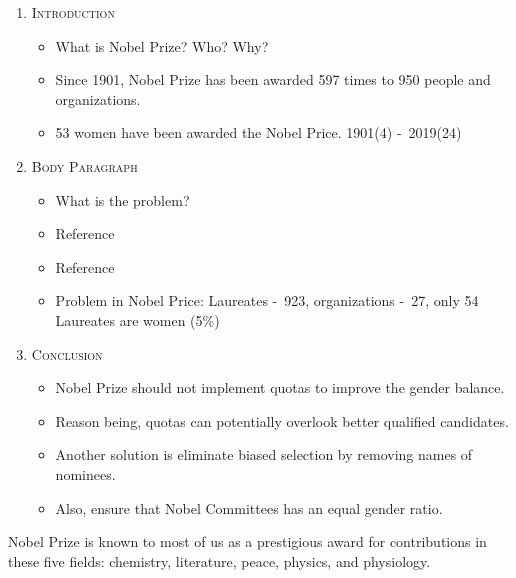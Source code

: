 \begin{enumerate}
  \item \textsc{Introduction}
  \begin{itemize}
    \item What is Nobel Prize? Who? Why?
    \item Since 1901, Nobel Prize has been awarded 597 times to 950 people and organizations. 
    \item 53 women have been awarded the Nobel Price. 1901(4) -\ 2019(24)
  \end{itemize}
  \item \textsc{Body Paragraph}
  \begin{itemize}
    \item What is the problem? 
    \item Reference \cite{doublebind} 
    \item Reference \cite{kopievanpbs}
    \item Problem in Nobel Price: Laureates -\ 923, organizations -\ 27, only 54 Laureates are women (5\%)\cite{alfrednoble}
  \end{itemize}
  \item \textsc{Conclusion}
  \begin{itemize}
    \item Nobel Prize should not implement quotas to improve the gender balance.
    \item Reason being, quotas can potentially overlook better qualified candidates.
    \item Another solution is eliminate biased selection by removing names of nominees.
    \item Also, ensure that Nobel Committees has an equal gender ratio.
  \end{itemize}
\end{enumerate}
\clearpage
{}
\par
Nobel Prize is known to most of us as a prestigious award for contributions in these five fields: 
chemistry, literature, peace, physics, and physiology.

 


